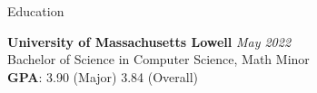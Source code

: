 \documentclass[
	10pt, %
]{resume} %
\begin{document}

\begin{rSection}{Education}
	
	\textbf{University of Massachusetts Lowell} \hfill \textit{May 2022} \\ 
	Bachelor of Science in Computer Science, Math Minor \\ \smallskip 
	\textbf{GPA}: 3.90 (Major) 3.84 (Overall)

	
\end{rSection}

\end{document}
